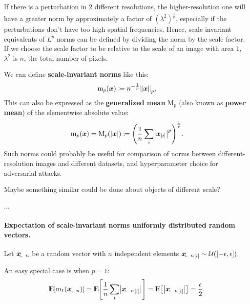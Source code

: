 \documentclass{article}
\begin{document}
If there is a perturbation in $2$ different resolutions, the higher-resolution one will have a greater norm by approximately a factor of $(\lambda^2)^\frac{1}{p}$, especially if the perturbations don't have too high spatial frequencies. Hence, scale invariant equivalents of $L^p$ norms can be defined by dividing the norm by the scale factor. If we choose the scale factor to be relative to the scale of an image with area $1$, $\lambda^2$ is $n$, the total number of pixels. 

We can define \textbf{scale-invariant norms} like this:
\begin{align}
    \mathrm{m}_p(\vec x) \coloneqq n^{-\frac{1}{p}}\enVert{\vec x}_p, \label{eq:scale-invariant-norm}
\end{align}
This can also be expressed as the \textbf{generalized mean} $\mathrm{M}_p$ (also known as \textbf{power mean}) of the elementwise absolute value:
\begin{align}
    \mathrm{m}_p(\vec x) = \mathrm{M}_p(\envert{\vec x}) \coloneqq \del{\frac{1}{n}\sum_i  \envert{\vec x_\ind{i}}^p}^{\frac{1}{p}}. \label{eq:generalized-mean}
\end{align}
Such norms could probably be useful for comparison of norms between different-resolution images and different datasets, and hyperparameter choice for adversarial attacks.

Maybe something similar could be done about objects of different scale?

...

\paragraph{Expectation of scale-invariant norms uniformly distributed random vectors.}
Let $\rvec x_n$ be a random vector with $n$ independent elements ${\rvec x_n}_\ind{i}\sim\mathcal{U}\del{\intcc{-\epsilon,\epsilon}}$.

An easy special case is when $p=1$:
\begin{align*}
    \E\sbr{\mathrm{m}_1(\rvec x_n)}
	= \E\sbr{\frac{1}{n}\sum_i \envert{{\rvec x_n}_\ind{i}}}
	= \E\sbr{\envert{{\rvec x_n}_\ind{i}}}  
	= \frac{\epsilon}{2} \text{.}
\end{align*}
\end{document}

